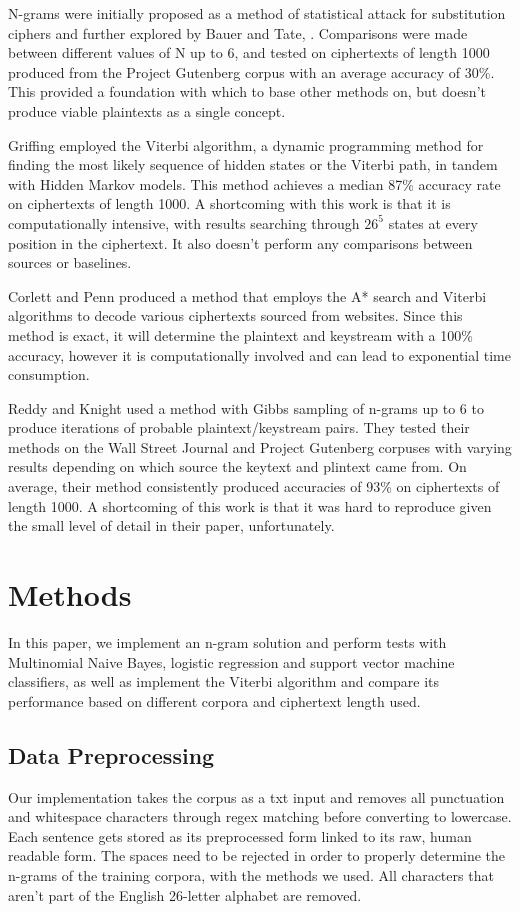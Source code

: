 \documentclass[11pt,letterpaper]{article}
\begin{document}
N-grams were initially proposed as a method of statistical attack for substitution ciphers and further explored by Bauer and Tate, \cite{Bauer:02}. Comparisons were made between different values of N up to 6, and tested on ciphertexts of length 1000 produced from the Project Gutenberg corpus with an average accuracy of 30\%. This provided a foundation with which to base other methods on, but doesn't produce viable plaintexts as a single concept.

Griffing \cite{Griffing:06} employed the Viterbi algorithm, a dynamic programming method for finding the most likely sequence of hidden states or the Viterbi path, in tandem with Hidden Markov models. This method achieves a median 87\% accuracy rate on ciphertexts of length 1000. A shortcoming with this work is that it is computationally intensive, with results searching through $26^5$ states at every position in the ciphertext. It also doesn't perform any comparisons between sources or baselines.

Corlett and Penn \cite{Corlett:10} produced a method that employs the A* search and Viterbi algorithms to decode various ciphertexts sourced from websites. Since this method is exact, it will determine the plaintext and keystream with a 100\% accuracy, however it is computationally involved and can lead to exponential time consumption.

Reddy and Knight \cite{Reddy:12} used a method with Gibbs sampling of n-grams up to 6 to produce iterations of probable plaintext/keystream pairs. They tested their methods on the Wall Street Journal and Project Gutenberg corpuses with varying results depending on which source the keytext and plintext came from. On average, their method consistently produced accuracies of 93\% on ciphertexts of length 1000. A shortcoming of this work is that it was hard to reproduce given the small level of detail in their paper, unfortunately. 

\section{Methods}
In this paper, we implement an n-gram solution and perform tests with Multinomial Naive Bayes, logistic regression and support vector machine classifiers, as well as implement the Viterbi algorithm and compare its performance based on different corpora and ciphertext length used. 

\subsection{Data Preprocessing}
Our implementation takes the corpus as a txt input and removes all punctuation and whitespace characters through regex matching before converting to lowercase. Each sentence gets stored as its preprocessed form linked to its raw, human readable form. The spaces need to be rejected in order to properly determine the n-grams of the training corpora, with the methods we used. All characters that aren't part of the English 26-letter alphabet are removed.
\end{document}
